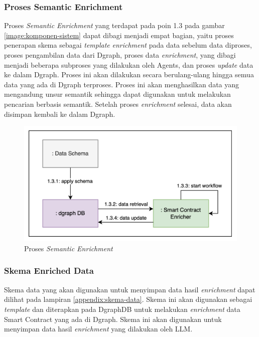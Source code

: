 \subsubsection{Proses Semantic Enrichment}

Proses \textit{Semantic Enrichment} yang terdapat pada poin 1.3 pada gambar \ref{image:komponen-sistem} dapat dibagi menjadi empat bagian, yaitu proses penerapan skema sebagai \textit{template} \textit{enrichment} pada data sebelum data diproses, proses pengambilan data dari Dgraph, proses data \textit{enrichment}, yang dibagi menjadi beberapa subproses yang dilakukan oleh Agents, dan proses \textit{update} data ke dalam Dgraph.
Proses ini akan dilakukan secara berulang-ulang hingga semua data yang ada di Dgraph terproses. Proses ini akan menghasilkan data yang mengandung unsur semantik sehingga dapat digunakan untuk melakukan pencarian berbasis semantik. Setelah proses \textit{enrichment} selesai, data akan disimpan kembali ke dalam Dgraph.

\begin{figure}[ht]
	\centering
	\includegraphics[width=1\textwidth]{resources/chapter-3/proses-semantik-enrichment.png}
	\caption{Proses \textit{Semantic Enrichment}}
	\label{image:proses-enrichment}
\end{figure}

\subsubsection{Skema Enriched Data}

Skema data yang akan digunakan untuk menyimpan data hasil \textit{enrichment} dapat dilihat pada lampiran \ref{appendix:skema-data}. Skema ini akan digunakan sebagai \textit{template} dan diterapkan pada DgraphDB untuk melakukan \textit{enrichment} data Smart Contract yang ada di Dgraph. Skema ini akan digunakan untuk menyimpan data hasil \textit{enrichment} yang dilakukan oleh LLM.

